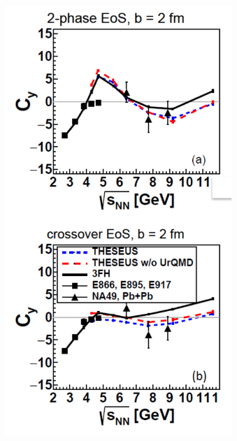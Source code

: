 \documentclass[dvipsnames] {beamer}
\begin{document}
\begin{frame}
\begin{columns}[t]
\begin{block}{\bf {}}
\begin{figure}[H]
        \includegraphics[width=1.0\linewidth]{graphs_Cy_central.pdf}
      \end{figure}
    \end{block}
    \begin{block}{\bf {}}
      \begin{figure}[H]

\end{figure}
\end{block}
\end{columns}
\end{frame}
\end{document}
